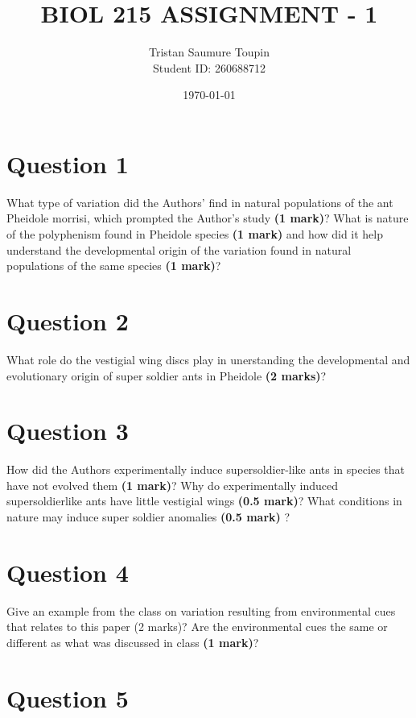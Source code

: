 \documentclass[letterpaper,12pt]{article}
\begin{document}
\title{BIOL 215 ASSIGNMENT - 1}
\author{Tristan Saumure Toupin \\ Student ID: 260688712}
\date{\today}
\maketitle


\section{Question 1}

What type of variation did the Authors’ find in natural populations of the ant Pheidole morrisi, which prompted the Author’s study \textbf{(1 mark)}? What is nature of the polyphenism found in Pheidole species \textbf{(1 mark)} and how did it help understand the developmental origin of the variation found in natural populations of the same species \textbf{(1 mark)}?


\section{Question 2}

What role do the vestigial wing discs play in unerstanding the developmental and evolutionary origin of super soldier ants in Pheidole \textbf{(2 marks)}?


\section{Question 3}

How did the Authors experimentally induce supersoldier-like ants in species that have not evolved them \textbf{(1 mark)}? Why do experimentally induced supersoldierlike ants have little vestigial wings \textbf{(0.5 mark)}? What conditions in nature may induce super soldier anomalies \textbf{(0.5 mark)} ?


\section{Question 4}

Give an example from the class on variation resulting from environmental cues that relates to this paper (2 marks)? Are the environmental cues the same or different as what was discussed in class \textbf{(1 mark)}?


\section{Question 5}
\end{document}
